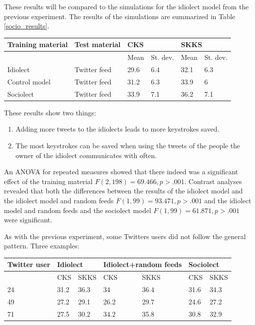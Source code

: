 \documentclass[11pt]{article}
\let\originaltable\table
\let\endoriginaltable\endtable
\renewenvironment{table}[1][ht]{%
  \originaltable[#1]
  \centering}%
  {\endoriginaltable}
\begin{document}
These results will be compared to the simulations for the idiolect model from the previous experiment. The results of the simulations are summarized in Table \ref{socio_results}.

\begin{table}[H] 
\centering
\begin{tabular}{ll|llll} 
Training material&Test material&\multicolumn{2}{l}{CKS}&\multicolumn{2}{l}{SKKS}\\
\hline
&&Mean&St. dev.&Mean&St. dev.\\
Idiolect&Twitter feed&29.6&6.4&32.1&6.3\\
Control model&Twitter feed&31.2&6.3&33.9&6\\
Sociolect&Twitter feed&33.9&7.1&36.2&7.1\\
\end{tabular} 
\caption{Mean percentage of keystrokes saved when using an idiolect, a control model (consisting of an idiolect and random other Twitter feeds) and a sociolect.} \label{socio_results}
\end{table}


These results show two things:

\begin{enumerate}
\item Adding more tweets to the idiolects leads to more keystrokes saved.
\item The most keystrokes can be saved when using the tweets of the people the owner of the idiolect communicates with often.
\end{enumerate}

An ANOVA for repeated measures showed that there indeed was a significant effect of the training material $F(2,198) = 69.466, p > .001$. Contrast analyses revealed that both the differences between the results of the idiolect model and the idiolect model and random feeds $F(1,99) = 93.471, p > .001$ and the idiolect model and random feeds and the sociolect model $F(1,99) = 61.871, p > .001$ were significant.

As with the previous experiment, some Twitters users did not follow the general pattern. Three examples:

\begin{table}[H] 
\centering
\begin{tabular}{l|llllll} 
Twitter user&\multicolumn{2}{l}{Idiolect}&\multicolumn{2}{l}{Idiolect+random feeds}&\multicolumn{2}{l}{Sociolect}\\
\hline
&CKS&SKKS&CKS&SKKS&CKS&SKKS\\
24&31.2&36.3&34&36.4&31.6&34.3\\
49&27.2&29.1&26.2&29.7&24.6&27.2\\
71&27.5&30.2&34.2&35.8&30.8&32.9\\
\end{tabular} 
\caption{Percentage of keystrokes saved for 3 individual Twitter users, using the the idiolect, control and sociolect models}
\end{table}
\end{document}
